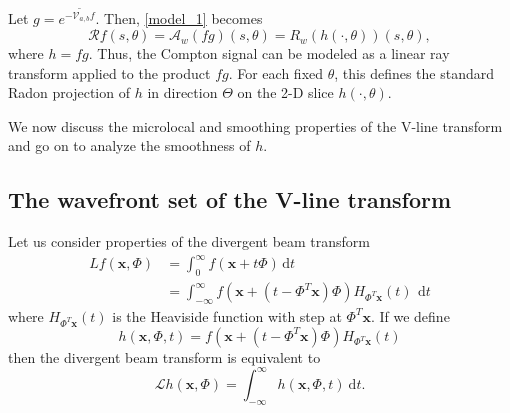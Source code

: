 \documentclass[a4paper,12pt]{amsart}
\numberwithin{equation}{section}
\theoremstyle{plain}
\numberwithin{theorem}{section}
\theoremstyle{definition}
\theoremstyle{remark}
\theoremstyle{remark}
\theoremstyle{remark}
\newcommand{\paren}[1]{\left(#1\right)}               %
\renewcommand{\d}{\,\mathrm{d}}  %
\newcommand{\tred}[1]{{\color{red}#1}}
\newcommand{\vx}{{\mathbf{x}}}
\begin{document}
Let $g = e^{-\widetilde{\mathcal{V}_{a,b}}f}$. Then, \eqref{model_1} becomes
\begin{equation}
\label{R_to_R}
\mathcal{R}f(s,\theta) = \mathcal{A}_w\paren{ f g }(s,\theta) = R_w(h(\cdot,\theta))(s,\theta),
\end{equation}
where $h = fg$. Thus, the Compton signal can be modeled as a linear ray transform applied to the product $fg$. For each fixed $\theta$, this defines the standard Radon projection of $h$ in direction $\Theta$ on the 2-D slice $h(\cdot,\theta)$.

We now discuss the microlocal and smoothing properties of the V-line transform and go on to analyze the smoothness of $h$.

\subsection{The wavefront set of the V-line transform}
Let us consider properties of the divergent beam transform
\[
\begin{split}
Lf(\vx,\Phi) & = \int_0^\infty f(\vx+t \Phi) \d t\\
& = \int_{-\infty}^\infty f(\vx + (t- \Phi^T \vx) \Phi) H_{\Phi^T \vx}(t) \ \d t
\end{split}
\]
where $H_{\Phi^T \vx}(t)$ is the Heaviside function with step at $\Phi^T \vx$. If we define
\[
h(\vx,\Phi,t) =  f(\vx + (t - \Phi^T \vx) \Phi) H_{\Phi^T \vx}(t)
\]
then the divergent beam transform is equivalent to
\[
\mathcal{L}h(\vx,\Phi) = \int_{-\infty}^\infty h(\vx,\Phi,t) \ \mathrm{d} t.
\]
\end{document}

